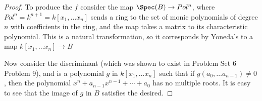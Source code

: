\documentclass[12 pt]{article}
\theoremstyle{definition}
\renewcommand{\(}{\left(}
\renewcommand{\)}{\right)}
\begin{document}
\begin{proof}
To produce the $f$ consider the map $\Spec(B) \to Pol^n$, where $Pol^n=k^{n+1}=k[x_1, \ldots x_{n}]$ sends a ring to the set of monic polynomials of degree $n$ with coefficients in the ring, and the map takes a matrix to its characteristic polynomial. This is a natural transformation, so it corresponds by Yoneda's to a map $k[x_1, \ldots x_n] \to B$

Now consider the discriminant (which was shown to exist in Problem Set 6 Problem 9), and is a polynomial $g$ in $k[x_1, \ldots x_{n}]$ such that if $g(a_0, \ldots a_{n-1}) \neq 0$, then the polynomial $x^n+a_{n-1}x^{n-1}+\cdots+a_0$ has no multiple roots. It is easy to see that the image of $g$ in $B$ satisfies the desired.


\end{proof}
\end{document}
